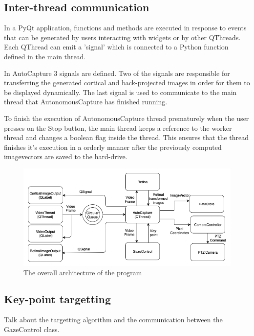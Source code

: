 \documentclass{l4proj}
\begin{document}
\subsection{Inter-thread communication}

In a PyQt application, functions and methods are executed in response to events that can be generated by users interacting with widgets or by other QThreads. Each QThread can emit a 'signal' which is connected to a Python function defined in the main thread. 

In AutoCapture 3 signals are defined. Two of the signals are responsible for transferring the generated cortical and back-projected images in order for them to be displayed dynamically. The last signal is used to communicate to the main thread that AutonomousCapture has finished running.

To finish the execution of AutonomousCapture thread prematurely when the user presses on the Stop button, the main thread keeps a reference to the worker thread and changes a boolean flag inside the thread. This ensures that the thread finishes it's execution in a orderly manner after the previously computed imagevectors are saved to the hard-drive. 



\begin{figure}[H]
    \centering
    \includegraphics[width=1\textwidth]{l4template-master/images/overallarchitecture.png}
    \caption{The overall architecture of the program}
    \label{overallarchitecture}
\end{figure}





\subsection{Key-point targetting}
Talk about the targetting algorithm and the communication between the GazeControl class. 
\end{document}
